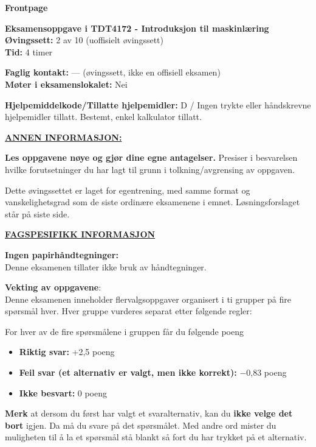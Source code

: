 \documentclass[11pt,a4paper]{article}
\begin{document}
\noindent\hspace*{-1.55em}%
{\sffamily\bfseries\fontsize{18}{22}\selectfont Frontpage}\par\vspace{1.1em}

{\bfseries Eksamensoppgave i TDT4172 - Introduksjon til maskinlæring}\\
{\bfseries Øvingssett:} 2 av 10 (uoffisielt øvingssett)\\
{\bfseries Tid:} 4 timer

\vspace{0.6em}
{\bfseries Faglig kontakt:} --- (øvingssett, ikke en offisiell eksamen)\\
{\bfseries Møter i eksamenslokalet:} Nei

\vspace{0.6em}
{\bfseries Hjelpemiddelkode/Tillatte hjelpemidler:} D / Ingen trykte eller håndskrevne hjelpemidler tillatt.
Bestemt, enkel kalkulator tillatt.

\vspace{0.6em}
{\bfseries\underline{ANNEN INFORMASJON:}}

\vspace{0.4em}
{\bfseries Les oppgavene nøye og gjør dine egne antagelser.} Presiser i besvarelsen hvilke forutsetninger du
har lagt til grunn i tolkning/avgrensing av oppgaven.

Dette øvingssettet er laget for egentrening, med samme format og vanskelighetsgrad som de
siste ordinære eksamenene i emnet. Løsningsforslaget står på siste side.

\vspace{1.6em}
{\bfseries\underline{FAGSPESIFIKK INFORMASJON}}

\vspace{0.4em}
{\bfseries Ingen papirhåndtegninger:}\\
Denne eksamenen tillater ikke bruk av håndtegninger.

\vspace{1.4em}
{\bfseries Vekting av oppgavene}:\\
Denne eksamenen inneholder flervalgsoppgaver organisert i ti grupper på fire spørsmål hver. Hver
gruppe vurderes separat etter følgende regler:

\vspace{0.6em}
For hver av de fire spørsmålene i gruppen får du følgende poeng
\begin{itemize}[leftmargin=2.2em,label=\textperiodcentered,itemsep=0pt]
\item {\bfseries Riktig svar:} +2,5 poeng
\item {\bfseries Feil svar (et alternativ er valgt, men ikke korrekt):} $-$0,83 poeng
\item {\bfseries Ikke besvart:} 0 poeng
\end{itemize}
{\bfseries Merk} at dersom du først har valgt et svaralternativ, kan du {\bfseries ikke velge det bort} igjen. Da må du
svare på det spørsmålet. Med andre ord mister du muligheten til å la et spørsmål stå blankt så fort
du har trykket på et alternativ.
\end{document}
